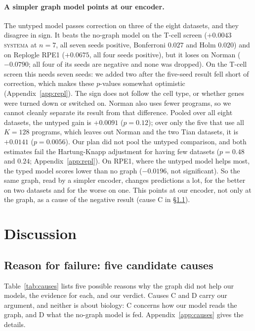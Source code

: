 \documentclass{article}
\begin{document}
\paragraph{A simpler graph model points at our encoder.} The untyped model passes correction on three of
the eight datasets, and they disagree in sign. It beats the no-graph model on the T-cell screen
($+0.0043$ \textsc{systema} at $n{=}7$, all seven seeds positive, Bonferroni $0.027$ and Holm $0.020$) and
on Replogle RPE1 ($+0.0675$, all four seeds positive), but it loses on Norman ($-0.0790$; all four of its
seeds are negative and none was dropped). On the T-cell screen this needs seven seeds: we added two after
the five-seed result fell short of correction, which makes these $p$-values somewhat optimistic
(Appendix~\ref{app:repl}). The sign does not follow the cell type, or whether genes were turned down or
switched on. Norman also uses fewer programs, so we cannot cleanly separate its result from that
difference. Pooled over all eight datasets, the untyped gain is $+0.0091$ ($p{=}0.12$); over only the
five that use all $K{=}128$ programs, which leaves out Norman and the two Tian datasets, it is $+0.0141$
($p{=}0.0056$). Our plan did not pool the untyped comparison, and both estimates fail the Hartung-Knapp
adjustment for having few datasets ($p{=}0.48$ and $0.24$; Appendix~\ref{app:repl}). On RPE1, where the untyped model helps most, the typed model scores lower than no graph
($-0.0196$, not significant). So the same graph, read by a simpler encoder, changes predictions a lot,
for the better on two datasets and for the worse on one. This points at our encoder, not only at the
graph, as a cause of the negative result (cause C in \S\ref{sec:causes}).

\section{Discussion}

\subsection{Reason for failure: five candidate causes}
\label{sec:causes}

Table~\ref{tab:causes} lists five possible reasons why the graph did not help our models, the evidence for each, and
our verdict. Causes C and D carry our argument, and neither is about biology: C concerns how our model
reads the graph, and D what the no-graph model is fed. Appendix~\ref{app:causes} gives the details.
\end{document}
